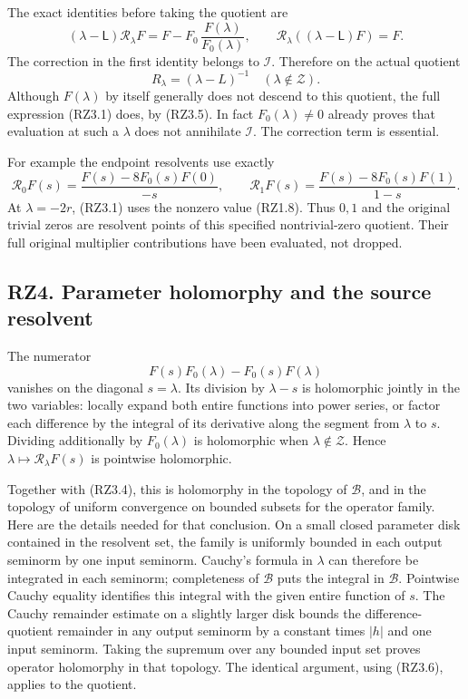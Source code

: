\documentclass[
]{article}
\begin{document}
The exact identities before taking the quotient are \[
(\lambda-\mathsf L)\mathscr R_\lambda F
=F-F_0\,\frac{F(\lambda)}{F_0(\lambda)},
\qquad
\mathscr R_\lambda((\lambda-\mathsf L)F)=F.
\tag{RZ3.7}
\] The correction in the first identity belongs to \(\mathcal I\).
Therefore on the actual quotient \[
\boxed{R_\lambda=(\lambda-L)^{-1}
\quad(\lambda\notin\mathscr Z).}
\tag{RZ3.8}
\] Although \(F(\lambda)\) by itself generally does not descend to this
quotient, the full expression (RZ3.1) does, by (RZ3.5). In fact
\(F_0(\lambda)\ne0\) already proves that evaluation at such a
\(\lambda\) does not annihilate \(\mathcal I\). The correction term is
essential.

For example the endpoint resolvents use exactly \[
\mathscr R_0F(s)=\frac{F(s)-8F_0(s)F(0)}{-s},
\qquad
\mathscr R_1F(s)=\frac{F(s)-8F_0(s)F(1)}{1-s}.
\tag{RZ3.9}
\] At \(\lambda=-2r\), (RZ3.1) uses the nonzero value (RZ1.8). Thus
\(0,1\) and the original trivial zeros are resolvent points of this
specified nontrivial-zero quotient. Their full original multiplier
contributions have been evaluated, not dropped.

\subsection{RZ4. Parameter holomorphy and the source
resolvent}\label{rz4.-parameter-holomorphy-and-the-source-resolvent}

The numerator \[
F(s)F_0(\lambda)-F_0(s)F(\lambda)
\tag{RZ4.1}
\] vanishes on the diagonal \(s=\lambda\). Its division by \(\lambda-s\)
is holomorphic jointly in the two variables: locally expand both entire
functions into power series, or factor each difference by the integral
of its derivative along the segment from \(\lambda\) to \(s\). Dividing
additionally by \(F_0(\lambda)\) is holomorphic when
\(\lambda\notin\mathscr Z\). Hence
\(\lambda\mapsto\mathscr R_\lambda F(s)\) is pointwise holomorphic.

Together with (RZ3.4), this is holomorphy in the topology of
\(\mathcal B\), and in the topology of uniform convergence on bounded
subsets for the operator family. Here are the details needed for that
conclusion. On a small closed parameter disk contained in the resolvent
set, the family is uniformly bounded in each output seminorm by one
input seminorm. Cauchy's formula in \(\lambda\) can therefore be
integrated in each seminorm; completeness of \(\mathcal B\) puts the
integral in \(\mathcal B\). Pointwise Cauchy equality identifies this
integral with the given entire function of \(s\). The Cauchy remainder
estimate on a slightly larger disk bounds the difference-quotient
remainder in any output seminorm by a constant times \(|h|\) and one
input seminorm. Taking the supremum over any bounded input set proves
operator holomorphy in that topology. The identical argument, using
(RZ3.6), applies to the quotient.
\end{document}

